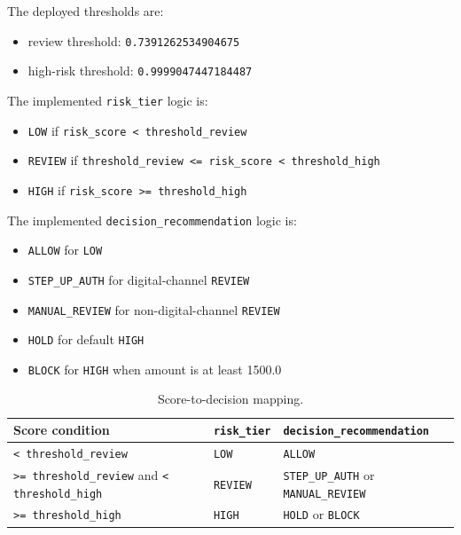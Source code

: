 \documentclass[11pt]{article}
\newcommand{\code}[1]{\texttt{#1}}
\begin{document}
The deployed thresholds are:
\begin{itemize}
  \item review threshold: \code{0.7391262534904675}
  \item high-risk threshold: \code{0.9999047447184487}
\end{itemize}

The implemented \code{risk_tier} logic is:
\begin{itemize}
  \item \code{LOW} if \code{risk_score < threshold_review}
  \item \code{REVIEW} if \code{threshold_review <= risk_score < threshold_high}
  \item \code{HIGH} if \code{risk_score >= threshold_high}
\end{itemize}

The implemented \code{decision_recommendation} logic is:
\begin{itemize}
  \item \code{ALLOW} for \code{LOW}
  \item \code{STEP_UP_AUTH} for digital-channel \code{REVIEW}
  \item \code{MANUAL_REVIEW} for non-digital-channel \code{REVIEW}
  \item \code{HOLD} for default \code{HIGH}
  \item \code{BLOCK} for \code{HIGH} when amount is at least 1500.0
\end{itemize}

\begin{table}[H]
\centering
\begin{tabular}{lll}
\toprule
Score condition & \code{risk_tier} & \code{decision_recommendation} \\
\midrule
\code{< threshold_review} & \code{LOW} & \code{ALLOW} \\
\code{>= threshold_review} and \code{< threshold_high} & \code{REVIEW} & \code{STEP_UP_AUTH} or \code{MANUAL_REVIEW} \\
\code{>= threshold_high} & \code{HIGH} & \code{HOLD} or \code{BLOCK} \\
\bottomrule
\end{tabular}
\caption{Score-to-decision mapping.}
\end{table}
\end{document}
